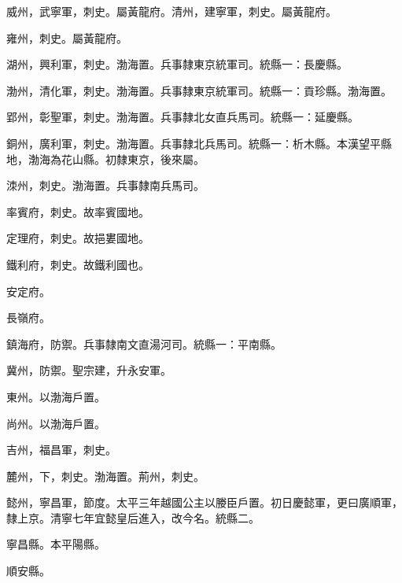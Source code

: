 \begin{pinyinscope}
 威州，武寧軍，刺史。屬黃龍府。清州，建寧軍，刺史。屬黃龍府。



 雍州，刺史。屬黃龍府。



 湖州，興利軍，刺史。渤海置。兵事隸東京統軍司。統縣一：長慶縣。



 渤州，清化軍，刺史。渤海置。兵事隸東京統軍司。統縣一：貢珍縣。渤海置。



 郢州，彰聖軍，刺史。渤海置。兵事隸北女直兵馬司。統縣一：延慶縣。



 銅州，廣利軍，刺史。渤海置。兵事隸北兵馬司。統縣一：析木縣。本漢望平縣地，渤海為花山縣。初隸東京，後來屬。



 洓州，刺史。渤海置。兵事隸南兵馬司。



 率賓府，刺史。故率賓國地。



 定理府，刺史。故挹婁國地。



 鐵利府，刺史。故鐵利國也。



 安定府。



 長嶺府。



 鎮海府，防禦。兵事隸南文直湯河司。統縣一：平南縣。



 冀州，防禦。聖宗建，升永安軍。



 東州。以渤海戶置。



 尚州。以渤海戶置。



 吉州，福昌軍，刺史。



 麓州，下，刺史。渤海置。荊州，刺史。



 懿州，寧昌軍，節度。太平三年越國公主以媵臣戶置。初日慶懿軍，更曰廣順軍，隸上京。清寧七年宜懿皇后進入，改今名。統縣二。



 寧昌縣。本平陽縣。



 順安縣。




\end{pinyinscope}
